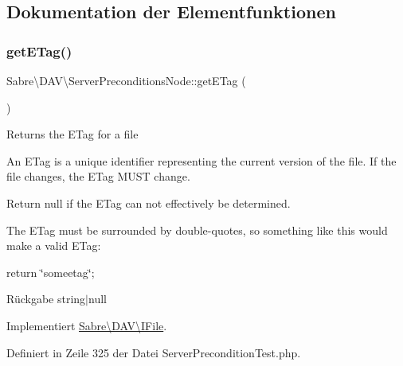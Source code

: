 \subsection{Dokumentation der Elementfunktionen}
\mbox{\label{class_sabre_1_1_d_a_v_1_1_server_preconditions_node_a87cade6d2776963f690d121cbed1360d}} 
\subsubsection{\texorpdfstring{get\+E\+Tag()}{getETag()}}
{\footnotesize\ttfamily Sabre\textbackslash{}\+D\+A\+V\textbackslash{}\+Server\+Preconditions\+Node\+::get\+E\+Tag (\begin{DoxyParamCaption}{ }\end{DoxyParamCaption})}

Returns the E\+Tag for a file

An E\+Tag is a unique identifier representing the current version of the file. If the file changes, the E\+Tag M\+U\+ST change.

Return null if the E\+Tag can not effectively be determined.

The E\+Tag must be surrounded by double-\/quotes, so something like this would make a valid E\+Tag\+:

return \textquotesingle{}\char`\"{}someetag\char`\"{}\textquotesingle{};

\begin{DoxyReturn}{Rückgabe}
string$\vert$null 
\end{DoxyReturn}


Implementiert \mbox{\hyperlink{interface_sabre_1_1_d_a_v_1_1_i_file_a2b207a6037dcbd4e7373b977dc60117f}{Sabre\textbackslash{}\+D\+A\+V\textbackslash{}\+I\+File}}.



Definiert in Zeile 325 der Datei Server\+Precondition\+Test.\+php.

\mbox{\label{class_sabre_1_1_d_a_v_1_1_server_preconditions_node_a313a36fb41543920bfe25f44da6ccf8b}} 
